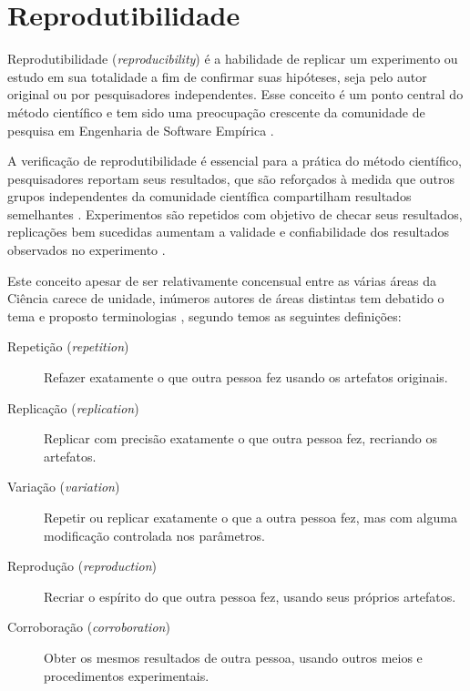 \section{Reprodutibilidade}

Reprodutibilidade ({\it reproducibility}) é a habilidade de replicar um
experimento ou estudo em sua totalidade a fim de confirmar suas hipóteses, seja
pelo autor original ou por pesquisadores independentes. Esse conceito é um
ponto central do método científico e tem sido uma preocupação crescente da
comunidade de pesquisa em Engenharia de Software Empírica
\cite{gonzalez_reproducibility_2012}.

A verificação de reprodutibilidade é essencial para a prática do método
científico, pesquisadores reportam seus resultados, que são reforçados à medida
que outros grupos independentes da comunidade científica compartilham
resultados semelhantes \cite{mccormick_itk_2014}. Experimentos são repetidos
com objetivo de checar seus resultados, replicações bem sucedidas aumentam a
validade e confiabilidade dos resultados observados no experimento
\cite{almqvist_replication_2006,juristo_replication_2012}.

Este conceito apesar de ser relativamente concensual entre as várias áreas da
Ciência carece de unidade, inúmeros autores de áreas distintas tem debatido o
tema e proposto terminologias \cite{drummond_replicability_2009,
vitek_repeatability_2011, mendoza_defining_2017, plesser_reproducibility_2018},
segundo  temos as seguintes
definições:

\begin{description}

  \item[Repetição ({\it repetition})]
  Refazer exatamente o que outra pessoa fez usando os artefatos originais.

  \item[Replicação ({\it replication})]
  Replicar com precisão exatamente o que outra pessoa fez, recriando os
  artefatos.

  \item[Variação ({\it variation})]
  Repetir ou replicar exatamente o que a outra pessoa fez, mas com alguma
  modificação controlada nos parâmetros.

  \item[Reprodução ({\it reproduction})]
  Recriar o espírito do que outra pessoa fez, usando seus próprios artefatos.

  \item[Corroboração ({\it corroboration})]
  Obter os mesmos resultados de outra pessoa, usando outros meios e
  procedimentos experimentais.

\end{description}

